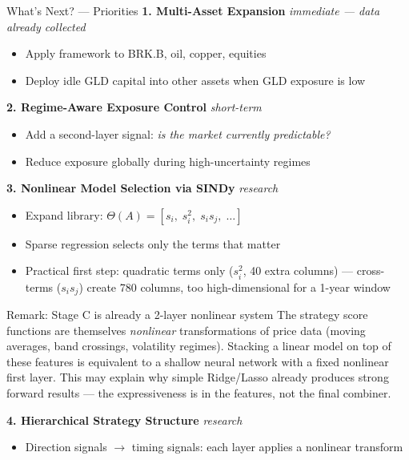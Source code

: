 \documentclass[aspectratio=169]{beamer}
\begin{document}
\begin{frame}{What's Next? — Priorities}
  \small
  \textbf{1. Multi-Asset Expansion} \hfill \textit{immediate — data already collected}
  \begin{itemize}
    \item Apply framework to BRK.B, oil, copper, equities
    \item Deploy idle GLD capital into other assets when GLD exposure is low
  \end{itemize}

  \vspace{0.4em}
  \textbf{2. Regime-Aware Exposure Control} \hfill \textit{short-term}
  \begin{itemize}
    \item Add a second-layer signal: \emph{is the market currently predictable?}
    \item Reduce exposure globally during high-uncertainty regimes
  \end{itemize}

  \vspace{0.4em}
  \textbf{3. Nonlinear Model Selection via SINDy} \hfill \textit{research}
  \begin{itemize}
    \item Expand library: \(\Theta(A) = [s_i,\; s_i^2,\; s_i s_j,\; \dots]\)
    \item Sparse regression selects only the terms that matter
    \item Practical first step: quadratic terms only (\(s_i^2\), 40 extra columns) ---
          cross-terms (\(s_i s_j\)) create 780 columns, too high-dimensional for a 1-year window
  \end{itemize}

  \vspace{0.3em}
  \begin{block}{Remark: Stage C is already a 2-layer nonlinear system}
    \small
    The strategy score functions are themselves \emph{nonlinear} transformations of price data
    (moving averages, band crossings, volatility regimes).
    Stacking a linear model on top of these features is equivalent to a shallow neural network
    with a fixed nonlinear first layer.
    This may explain why simple Ridge/Lasso already produces strong forward results ---
    the expressiveness is in the features, not the final combiner.
  \end{block}

  \vspace{0.4em}
  \textbf{4. Hierarchical Strategy Structure} \hfill \textit{research}
  \begin{itemize}
    \item Direction signals $\to$ timing signals: each layer applies a nonlinear transform
  \end{itemize}
\end{frame}
\end{document}

